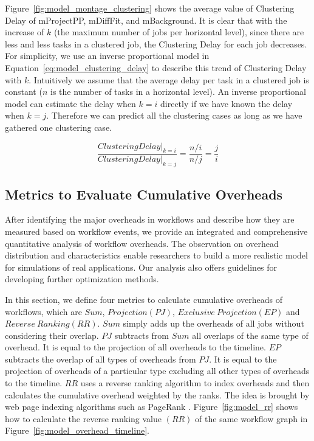Figure~\ref{fig:model_montage_clustering} shows the average value of Clustering Delay of mProjectPP, mDiffFit, and mBackground. It is clear that with the increase of $k$ (the maximum number of jobs per horizontal level), since there are less and less tasks in a clustered job, the Clustering Delay for each job decreases. For simplicity, we use an inverse proportional model in Equation~\ref{eq:model_clustering_delay} to describe this trend of Clustering Delay with $k$. Intuitively we assume that the average delay per task in a clustered job is constant ($n$ is the number of tasks in a horizontal level). An inverse proportional model can estimate the delay when $k=i$ directly if we have known the delay when $k=j$. Therefore we can predict all the clustering cases as long as we have gathered one clustering case. 

\begin{equation} \label{eq:model_clustering_delay}
\frac{Clustering Delay|_{k=i}}{Clustering Delay|_{k=j}}=\frac{n/i}{n/j}=\frac{j}{i}
\end{equation}



\subsection{Metrics to Evaluate Cumulative Overheads}

After identifying the major overheads in workflows and describe how they are measured based on workflow events, we provide an integrated and comprehensive quantitative analysis of workflow overheads. The observation on overhead distribution and characteristics enable researchers to build a more realistic model for simulations of real applications. Our analysis also offers guidelines for developing further optimization methods. 


In this section, we define four metrics to calculate cumulative overheads of workflows, which are $Sum$, $Projection(PJ)$, $Exclusive~Projection(EP)$ and $Reverse~Ranking(RR)$. $Sum$ simply adds up the overheads of all jobs without considering their overlap. $PJ$ subtracts from $Sum$ all overlaps of the same type of overhead. It is equal to the projection of all overheads to the timeline. $EP$ subtracts the overlap of all types of overheads from $PJ$. It is equal to the projection of overheads of a particular type excluding all other types of overheads to the timeline.
$RR$ uses a reverse ranking algorithm to index overheads and then calculates the cumulative overhead weighted by the ranks. The idea is brought by web page indexing algorithms such as PageRank \cite{PageRank1999}. Figure~\ref{fig:model_rr} shows how to calculate the reverse ranking value $(RR)$ of the same workflow graph in Figure~\ref{fig:model_overhead_timeline}.
 
